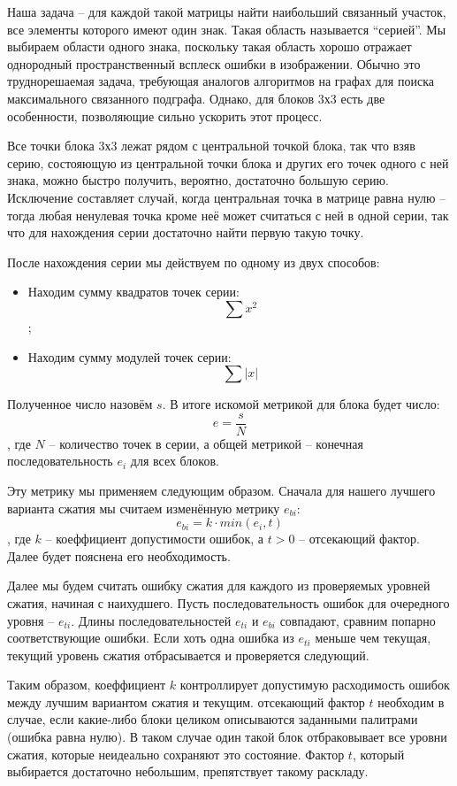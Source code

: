 \documentclass[a4paper,12pt]{article}
\numberwithin{equation}{section}
\begin{document}
Наша задача -- для каждой такой матрицы найти наибольший связанный участок, все
элементы которого имеют один знак. Такая область называется ``серией''. Мы
выбираем области одного знака, поскольку такая область хорошо отражает
однородный пространственный всплеск ошибки в изображении. Обычно это
труднорешаемая задача, требующая аналогов алгоритмов на графах для поиска
максимального связанного подграфа. Однако, для блоков 3х3 есть две особенности,
позволяющие сильно ускорить этот процесс.

Все точки блока 3х3 лежат рядом с центральной точкой блока, так что взяв серию,
состояющую из центральной точки блока и других его точек одного с ней знака,
можно быстро получить, вероятно, достаточно большую серию. Исключение составляет
случай, когда центральная точка в матрице равна нулю -- тогда любая ненулевая
точка кроме неё может считаться с ней в одной серии, так что для нахождения
серии достаточно найти первую такую точку.

После нахождения серии мы действуем по одному из двух способов:

\begin{itemize}
\item Находим сумму квадратов точек серии: $$\sum x^2$$;
\item Находим сумму модулей точек серии: $$\sum |x|$$
\end{itemize}

Полученное число назовём $s$. В итоге искомой метрикой для блока будет число:
\[ e = \frac{s}{N} \]
, где $N$ -- количество точек в серии, а общей метрикой -- конечная
последовательность $e_i$ для всех блоков.

Эту метрику мы применяем следующим образом. Сначала для нашего лучшего варианта
сжатия мы считаем изменённую метрику $e_{bi}$:
\[ e_{bi} = k \cdot min(e_i, t) \]
, где $k$ -- коеффициент допустимости ошибок, а $t > 0$ -- отсекающий
фактор. Далее будет пояснена его необходимость.

Далее мы будем считать ошибку сжатия для каждого из проверяемых уровней сжатия,
начиная с наихудшего. Пусть последовательность ошибок для очередного уровня --
$e_{ti}$. Длины последовательностей $e_{ti}$ и $e_{bi}$ совпадают, сравним
попарно соответствующие ошибки. Если хоть одна ошибка из $e_{ti}$ меньше чем
текущая, текущий уровень сжатия отбрасывается и проверяется следующий.

Таким образом, коеффициент $k$ контроллирует допустимую расходимость ошибок
между лучшим вариантом сжатия и текущим. отсекающий фактор $t$ необходим в
случае, если какие-либо блоки целиком описываются заданными палитрами (ошибка
равна нулю). В таком случае один такой блок отбраковывает все уровни сжатия,
которые неидеально сохраняют это состояние. Фактор $t$, который выбирается
достаточно небольшим, препятствует такому раскладу.
\end{document}
